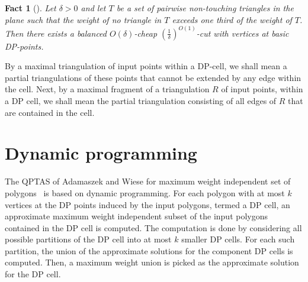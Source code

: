 \documentclass[a4paper]{article}
\newtheorem{fact}{Fact}
\begin{document}
\begin{fact}[\cite{AW14}] Let $\delta >0$ 
and let $T$ be a set of pairwise non-touching triangles
in the plane such that the weight of no triangle in $T$
exceeds one third of the weight of $T$. Then there exists
a balanced $O(\delta)$-cheap $(\frac 1{\delta} )^{O(1)}$-cut 
with vertices at basic DP-points.
\end{fact}

By a maximal triangulation of input points within a DP-cell,
we shall mean a partial
triangulations of these points
that cannot be extended by any edge within the cell.
Next, by a maximal fragment of a triangulation $R$ of input points, within a
DP cell, we shall mean the partial triangulation consisting of all
edges of $R$ that are contained  in the cell.

\section{Dynamic programming}

The QPTAS of Adamaszek and Wiese
for maximum weight independent set of polygons~\cite{AW14} is
based on dynamic programming. For each polygon
with at most $k$ vertices at the 
DP points induced by the input polygons, termed a DP cell, an approximate
maximum weight independent subset of the input polygons contained
in the DP cell is computed. The computation is done
by considering all possible partitions of the DP cell into
at most $k$ smaller DP cells. For each such partition,
the union of the approximate solutions for the component
DP cells is computed. Then, a maximum weight union
is picked as the approximate solution for the DP cell.
\end{document}
